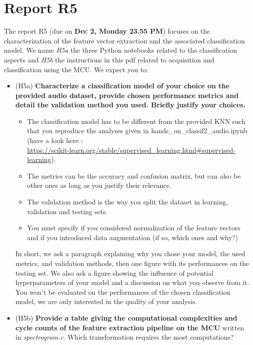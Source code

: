 \section{Report R5}
%
The report R5 (due on \textbf{Dec 2, Monday 23.55 PM}) focuses on the characterization of the feature vector extraction and the associated classification model. We name \emph{H5a} the three Python notebooks related to the classification aspects and \emph{H5b} the instructions in this pdf related to acquisition and classification using the MCU. We expect you to:
%
\begin{itemize}
    \item (H5a) \textbf{Characterize a classification model of your choice on the provided audio dataset, provide chosen performance metrics and detail the validation method you used. Briefly justify your choices.}
    \begin{itemize}
        \item The classification model has to be different from the provided KNN such that you reproduce the analyses given in hands\_on\_classif2\_audio.ipynb (have a look here :\\ \url{https://scikit-learn.org/stable/supervised\_learning.html#supervised-learning}).
        \item The metrics can be the accuracy and confusion matrix, but can also be other ones as long as you justify their relevance.
        \item The validation method is the way you split the dataset in learning, validation and testing sets.
        \item You must specify if you considered normalization of the feature vectors and if you introduced data augmentation (if so, which ones and why?)
    \end{itemize}
    In short, we ask a paragraph explaining why you chose your model, the used metrics, and validation methods, then one figure with its performances on the testing set. We also ask a figure showing the influence of potential hyperparameters of your model and a discussion on what you observe from it. You won't be evaluated on the performances of the chosen classification model, we are only interested in the quality of your analysis.
    \item (H5b) \textbf{Provide a table giving the computational complexities and cycle counts of the feature extraction pipeline on the MCU} written in \emph{spectrogram.c}. Which transformation requires the most computations? \\

\end{itemize}
